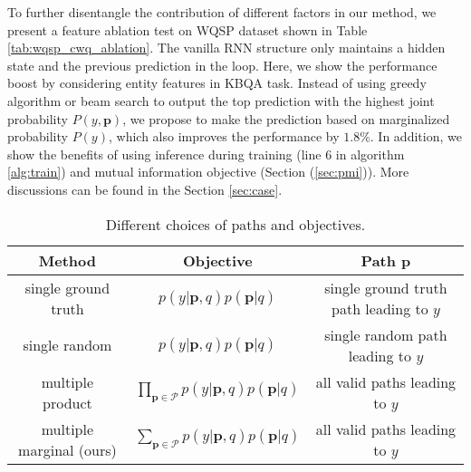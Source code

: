 To further disentangle the contribution of different factors in our method, we present a feature ablation test on WQSP dataset shown in Table \ref{tab:wqsp_cwq_ablation}. The vanilla RNN structure only maintains a hidden state and the previous prediction in the loop. Here, we show the performance boost by considering entity features in KBQA task. Instead of using greedy algorithm or beam search to output the top prediction with the highest joint probability $P(y,\mathbf{p})$, we propose to make the prediction based on marginalized probability $P(y)$, which also improves the performance by $1.8\%$. In addition, we show the benefits of using inference during training (line 6 in algorithm \ref{alg:train}) and mutual information objective (Section (\ref{sec:pmi})). More discussions can be found in the Section \ref{sec:case}. 

\begin{table*}[t]
  \centering
  \begin{tabular}{|c|c|c|}
  \hline
  Method & Objective & Path $\mathbf{p}$ \\
  \hline
     single ground truth& $ p(y|\mathbf{p},q)p(\mathbf{p}|q)$ & single ground truth path leading to $y$\\
    \hline
    single random& $ p(y|\mathbf{p},q)p(\mathbf{p}|q)$ & single random path leading to $y$\\
     \hline
        multiple product& $\prod_{\mathbf{p}\in\mathcal{P}} p(y|\mathbf{p},q)p(\mathbf{p}|q)$ & all valid paths leading to $y$\\
        \hline
     multiple marginal (ours)& $\sum_{\mathbf{p}\in\mathcal{P}} p(y|\mathbf{p},q)p(\mathbf{p}|q)$ & all valid paths leading to $y$\\
     \hline
  \end{tabular}
  \caption{Different choices of paths and objectives.}
  \label{tab:obj_fcn}
\end{table*}


